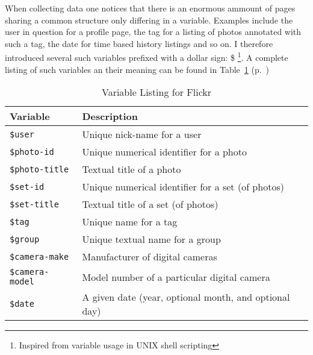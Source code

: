 \documentclass[11pt,a4paper]{article}
\newcommand{\var}[1]{\texttt{\${#1}}}
\begin{document}
When collecting data one notices that there is an enormous ammount of pages
sharing a common structure only differing in a variable. Examples include
the user in question for a profile page, the tag for a listing of photos
annotated with such a tag, the date for time based history listings and so on.
I therefore introduced several such variables prefixed with a dollar sign: \$
\footnote{Inspired from variable usage in UNIX shell scripting}. A complete
listing of such variables an their meaning can be found in
Table~\ref{table:flickr.variable.list}
(p.~\pageref{table:flickr.variable.list})

\begin{table}[h!b!p!]
  \begin{center}
    \caption[]{Variable Listing for Flickr}
    \label{table:flickr.variable.list}
    \begin{small}
    \begin{tabular}{lp{8cm}}

      \toprule
      Variable & Description \\
      \midrule

      \var{user} &
      Unique nick-name for a user \\

      \var{photo-id} &
      Unique numerical identifier for a photo \\

      \var{photo-title} &
      Textual title of a photo \\

      \var{set-id} &
      Unique numerical identifier for a set (of photos) \\

      \var{set-title} &
      Textual title of a set (of photos) \\

      \var{tag} &
      Unique name for a tag \\

      \var{group} &
      Unique textual name for a group \\

      \var{camera-make} &
      Manufacturer of digital cameras \\

      \var{camera-model} &
      Model number of a particular digital camera \\

      \var{date} &
      A given date (year, optional month, and optional day) \\


\end{tabular}
\end{small}
\end{center}
\end{table}
\end{document}
